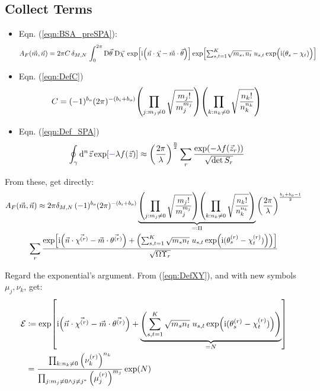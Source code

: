\documentclass[
	english,
	a4paper,
	fontsize=10pt,
	parskip=half,
	titlepage=true,
	DIV=12,
	final
]{scrreprt}
\newcommand*{\iunit}{\ensuremath{\mathrm{i}}}
\newcommand*{\DD}[1]{\ensuremath{\text{D}\vec{#1}\;}}
\begin{document}
\subsection{Collect Terms}
\begin{itemize}
\item Eqn. (\ref{eqn:BSA_preSPA}):
	\begin{align*}	
		A_F(\vec{m}, \vec{n})
	=
		2\pi C \, \delta_{M,N} \,
		\int_{0}^{2\pi}
			\DD{\theta} \DD{\chi}
		\exp[
			\iunit \qty(
				\vec{n} \cdot \vec{\chi}
				-
				\vec{m} \cdot \vec{\theta}
			)]
		\exp[
			{\textstyle \sum_{s,t=1}^{K} }
				\sqrt{m_s, n_t} \;
				u_{s,t}
				\exp(\Big. \iunit(\theta_s - \chi_t) )
		]
	\end{align*}
\item Eqn. (\ref{eqn:DefC})
	\begin{align*}
		C
	&=
		(-1)^{b_o}
		(2\pi)^{-(b_i + b_o)}
		\qty( \prod_{j : m_j \neq 0}
			\sqrt{\frac
				{ m_j! }
				{ m_j^{m_j} }
			}
		)
		\qty( \prod_{k : n_k \neq 0}
			\sqrt{\frac
				{ n_k! }
				{ n_k^{n_k} }
			}
		)
	\end{align*}
\item Eqn. (\ref{eqn:Def_SPA})
	\begin{align*}
		\oint_{\gamma} \dd[n]{\vec{z}}
			\exp[{\color{blue} -}\lambda f(\vec{z})]
	&\approx
		\qty( \frac
			{2\pi}
			{\lambda}
		)^{\frac{n}{2}}
		\sum_{r}
			\frac
			{\exp(-\lambda f(\vec{z}_r))}
			{\sqrt{\det S_r}}
	\end{align*}
\end{itemize}

From these, get directly:
\begin{multline}
	A_F(\vec{m}, \vec{n})
\approx
	2\pi \delta_{M,N} \,	
	(-1)^{b_o}
	(2\pi)^{-(b_i + b_o)}
	\underbrace{
		\qty( \prod_{j : m_j \neq 0}
			\sqrt{\frac
				{ m_j! }
				{ m_j^{m_j} }
			}
		)
		\qty( \prod_{k : n_k \neq 0}
			\sqrt{\frac
				{ n_k! }
				{ n_k^{n_k} }
			}
		)
	}_{\eqqcolon \Pi}
	\qty( \frac
		{2\pi}
		{\lambda}
	)^{\frac{b_i + b_o - 1}{2}}
\\
	\sum_{r}
		\frac
		{\exp[
			\iunit
			\qty(
				\vec{n} \cdot \vec{\chi^{(r)}}
				- 
				\vec{m} \cdot \vec{\theta^{(r)}}
			)
		+
		\qty(
			\sum_{s,t=1}^{K}
			\sqrt{m_s n_t} \;
			u_{s,t}
			\exp(\big.
				\iunit(\theta_s^{(r)} - \chi_t^{(r)})
			)
		)
		]}
		{\sqrt{\Omega \Upsilon_r}}
\end{multline}

Regard the exponential's argument. From (\ref{eqn:DefXY}), and with new symbols $\mu_j, \nu_k$, get:
\begin{align}
	\mathcal{E}
&\coloneqq
	\exp[
			\iunit
			\qty(
				\vec{n} \cdot \vec{\chi^{(r)}}
				- 
				\vec{m} \cdot \vec{\theta^{(r)}}
			)
		+
		\underbrace{\qty(
			\sum_{s,t=1}^{K}
			\sqrt{m_s n_t} \;
			u_{s,t}
			\exp(\big.
				\iunit(\theta_s^{(r)} - \chi_t^{(r)})
			)
		)}_{=N}
	] \\
&=
	\frac
		{\prod_{k : n_k \neq 0}                  \qty(\nu_k^{(r)})^{n_k}}
		{\prod_{j : m_j \neq 0 \land j \neq j^*} \qty(\mu_j^{(r)})^{m_j}}
	\exp(N)
\end{align}
\end{document}
